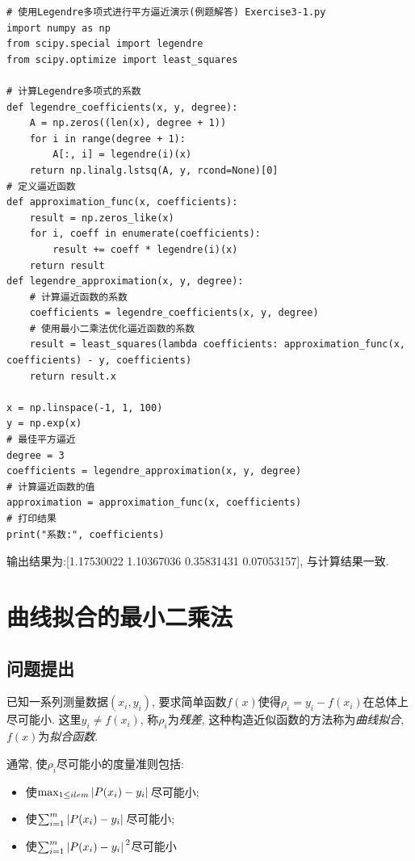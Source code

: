 \begin{lstlisting}
# 使用Legendre多项式进行平方逼近演示(例题解答) Exercise3-1.py
import numpy as np
from scipy.special import legendre
from scipy.optimize import least_squares

# 计算Legendre多项式的系数
def legendre_coefficients(x, y, degree):
    A = np.zeros((len(x), degree + 1))
    for i in range(degree + 1):
        A[:, i] = legendre(i)(x)
    return np.linalg.lstsq(A, y, rcond=None)[0]
# 定义逼近函数
def approximation_func(x, coefficients):
    result = np.zeros_like(x)
    for i, coeff in enumerate(coefficients):
        result += coeff * legendre(i)(x)
    return result
def legendre_approximation(x, y, degree):
    # 计算逼近函数的系数
    coefficients = legendre_coefficients(x, y, degree)
    # 使用最小二乘法优化逼近函数的系数
    result = least_squares(lambda coefficients: approximation_func(x, coefficients) - y, coefficients)
    return result.x

x = np.linspace(-1, 1, 100)
y = np.exp(x)
# 最佳平方逼近
degree = 3
coefficients = legendre_approximation(x, y, degree)
# 计算逼近函数的值
approximation = approximation_func(x, coefficients)
# 打印结果
print("系数:", coefficients)
\end{lstlisting}

输出结果为:[1.17530022 1.10367036 0.35831431 0.07053157], 与计算结果一致.

\section{曲线拟合的最小二乘法}

\subsection{问题提出}

已知一系列测量数据$(x_i,y_i)$, 要求简单函数$f(x)$使得$\rho_i=y_i-f(x_i)$在总体上尽可能小. 这里$y_i\ne f(x_i)$, 称$\rho_i$为\emph{残差}, 这种构造近似函数的方法称为\emph{曲线拟合}, $f(x)$为\emph{拟合函数}.

通常, 使$\rho_i$尽可能小的度量准则包括:

\begin{itemize}
    \item 使$\max_{1\le ile m}\abs*{P(x_i)-y_i}$尽可能小;
    \item 使$\sum_{i=1}^m\abs*{P(x_i)-y_i}$尽可能小;
    \item 使$\sum_{i=1}^m\abs*{P(x_i)-y_i}^2$尽可能小
\end{itemize}

